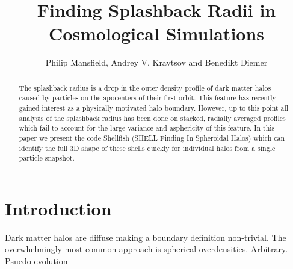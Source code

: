\documentclass[numberedappendix,apj]{emulateapj}
\begin{document}


\title{Finding Splashback Radii in Cosmological Simulations}

\author{Philip Mansfield, Andrey V. Kravtsov and Benedikt Diemer}




\begin{abstract}

The splashback radius is a drop in the outer density profile of dark matter
halos caused by particles on the apocenters of their first orbit.
This feature has recently gained interest as a physically motivated halo
boundary. However, up to this point all analysis of the splashback radius has
been done on stacked, radially averaged profiles which fail to account for the
large variance and asphericity of this feature. In this paper we present the
code Shellfish (SHELL Finding In Spheroidal Halos) which can identify the full
3D shape of these shells quickly for individual halos from a single particle
snapshot.

\end{abstract} 

\section{Introduction}
\label{sec:introduction}

Dark matter halos are diffuse making a boundary definition non-trivial. The
overwhelmingly most common approach is spherical overdensities. Arbitrary.
Psuedo-evolution
\end{document}
